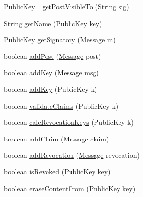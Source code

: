 \begin{DoxyCompactItemize}
\item 
Public\-Key\mbox{[}$\,$\mbox{]} \hyperlink{classballmerpeak_1_1turtlenet_1_1server_1_1Database_a0ccbad682720c86cb152de04a7052332}{get\-Post\-Visible\-To} (String sig)
\item 
String \hyperlink{classballmerpeak_1_1turtlenet_1_1server_1_1Database_a102153ec0531bc6be459d0879c78051d}{get\-Name} (Public\-Key key)
\item 
Public\-Key \hyperlink{classballmerpeak_1_1turtlenet_1_1server_1_1Database_a890f60c47e11af8823d48689fdeac360}{get\-Signatory} (\hyperlink{classballmerpeak_1_1turtlenet_1_1shared_1_1Message}{Message} m)
\item 
boolean \hyperlink{classballmerpeak_1_1turtlenet_1_1server_1_1Database_a8456bb059a9438ecc03a8c65c2cf908a}{add\-Post} (\hyperlink{classballmerpeak_1_1turtlenet_1_1shared_1_1Message}{Message} post)
\item 
boolean \hyperlink{classballmerpeak_1_1turtlenet_1_1server_1_1Database_add2acddf62824bcedfe2724257ab0b04}{add\-Key} (\hyperlink{classballmerpeak_1_1turtlenet_1_1shared_1_1Message}{Message} msg)
\item 
boolean \hyperlink{classballmerpeak_1_1turtlenet_1_1server_1_1Database_a4641ac050b40864856bb7ab903fb96c2}{add\-Key} (Public\-Key k)
\item 
boolean \hyperlink{classballmerpeak_1_1turtlenet_1_1server_1_1Database_a1d9276229eb90ede286f8ecbee955248}{validate\-Claims} (Public\-Key k)
\item 
boolean \hyperlink{classballmerpeak_1_1turtlenet_1_1server_1_1Database_a222ba2352c2b9c48dd9c66470d106623}{calc\-Revocation\-Keys} (Public\-Key k)
\item 
boolean \hyperlink{classballmerpeak_1_1turtlenet_1_1server_1_1Database_afc065fd588fdbd556bd2a013e648b43d}{add\-Claim} (\hyperlink{classballmerpeak_1_1turtlenet_1_1shared_1_1Message}{Message} claim)
\item 
boolean \hyperlink{classballmerpeak_1_1turtlenet_1_1server_1_1Database_ac4eeb9a2d74bd6cfe1e72f63fc93243b}{add\-Revocation} (\hyperlink{classballmerpeak_1_1turtlenet_1_1shared_1_1Message}{Message} revocation)
\item 
boolean \hyperlink{classballmerpeak_1_1turtlenet_1_1server_1_1Database_ab3e267a71350c940b476949722eda0eb}{is\-Revoked} (Public\-Key key)
\item 
boolean \hyperlink{classballmerpeak_1_1turtlenet_1_1server_1_1Database_a6b4d12d2583d01113c6ba154a94261af}{erase\-Content\-From} (Public\-Key key)
\item 

\end{DoxyCompactItemize}
